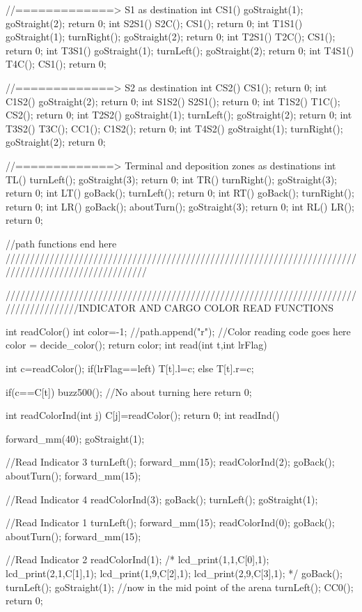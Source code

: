 //=============> S1 as destination
int CS1()
{
	goStraight(1);
	goStraight(2);
	return 0;
}
int S2S1()
{
    S2C();
    CS1();
	return 0;
}
int T1S1()
{
	goStraight(1);
	turnRight();
	goStraight(2);
	return 0;
}
int T2S1()
{
	T2C();
	CS1();
	return 0;
}
int T3S1()
{
	goStraight(1);
	turnLeft();
	goStraight(2);
	return 0;
}
int T4S1()
{
	T4C();
	CS1();
	return 0;
}

//=============> S2 as destination
int CS2()
{
	CS1();
	return 0;
}
int C1S2()
{
	goStraight(2);
	return 0;
}
int S1S2()
{
	S2S1();
	return 0;
}
int T1S2()
{
	T1C();
	CS2();
	return 0;
}
int T2S2()
{
	goStraight(1);
	turnLeft();
	goStraight(2);
	return 0;
}
int T3S2()
{
	T3C();
	CC1();
	C1S2();
	return 0;
}
int T4S2()
{
	goStraight(1);
	turnRight();
	goStraight(2);
	return 0;
}

//=============> Terminal and deposition zones as destinations
int TL()
{
    turnLeft();
	goStraight(3);
    return 0;
}
int TR()
{
    turnRight();
	goStraight(3);
    return 0;
}
int LT()
{
    goBack();
    turnLeft();
    return 0;
}
int RT()
{
    goBack();
    turnRight();
    return 0;
}
int LR()
{
    goBack();
	aboutTurn();
	goStraight(3);
    return 0;
}
int RL()
{
    LR();
    return 0;
}

//path functions end here
/////////////////////////////////////////////////////////////////////////////////////////////////////


///////////////////////////////////////////////////////////////////////////////////////INDICATOR AND CARGO COLOR READ FUNCTIONS

int readColor()
{
	int color=-1;
	//path.append("r");
	//Color reading code goes here
	color = decide_color();
	return color;
}
int read(int t,int lrFlag)
{
	int c=readColor();
    if(lrFlag==left)
        T[t].l=c;
    else
        T[t].r=c;
    
	if(c==C[t])
		buzz500();
	//No about turning here
    return 0;
}
int readColorInd(int j)
{
	C[j]=readColor();
	return 0;
}
int readInd()
{
	forward_mm(40);
    goStraight(1);
    
    //Read Indicator 3
    turnLeft();
	forward_mm(15);
    readColorInd(2);
    goBack();
    aboutTurn();
	forward_mm(15);
	
    //Read Indicator 4
    readColorInd(3);
    goBack();
	turnLeft();
    goStraight(1);
    
    
    //Read Indicator 1
    turnLeft();
    forward_mm(15);
	readColorInd(0);
    goBack();
    aboutTurn();
    forward_mm(15);
    
    //Read Indicator 2
    readColorInd(1);
	/*
    lcd_print(1,1,C[0],1);
    lcd_print(2,1,C[1],1);
    lcd_print(1,9,C[2],1);
    lcd_print(2,9,C[3],1);
	*/
    goBack();
    turnLeft();
    goStraight(1);
    //now in the mid point of the arena
    turnLeft();
	CC0();
	return 0;
}

